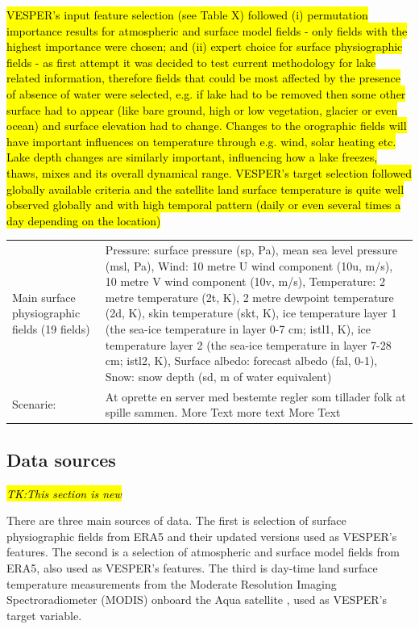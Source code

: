 \documentclass[hess, manuscript]{copernicus}
\begin{document}
\hl{VESPER's input feature selection (see Table X) followed (i) permutation importance results for atmospheric and surface model fields - only fields with the highest importance were chosen; and (ii) expert choice for surface physiographic fields - as first attempt it was decided to test current methodology for lake related information, therefore fields that could be most affected by the presence of absence of water were selected, e.g. if lake had to be removed then some other surface had to appear (like bare ground, high or low vegetation, glacier or even ocean) and surface elevation had to change. Changes to the orographic fields will have important influences on temperature through e.g. wind, solar heating etc. Lake depth changes are similarly important, influencing how a lake freezes, thaws, mixes and its overall dynamical range. VESPER's target selection followed globally available criteria and the satellite land surface temperature is quite well observed globally and with high temporal pattern (daily or even several times a day depending on the location)}

\begin{table}[h]
	\begin{tabularx}{\textwidth}{lX}
		\hline
		Main surface physiographic fields
		(19 fields)          & Pressure: surface pressure (sp, Pa), mean sea level pressure (msl, Pa), 
		Wind: 10 metre U wind component (10u, m/s), 10 metre V wind component (10v, m/s), 
		Temperature: 2 metre temperature (2t, K), 2 metre dewpoint temperature (2d, K), skin temperature (skt, K), ice temperature layer 1 (the sea-ice temperature in layer 0-7 cm; istl1, K), ice temperature layer 2 (the sea-ice temperature in layer 7-28 cm; istl2, K), 
		Surface albedo: forecast albedo (fal, 0-1), 
		Snow: snow depth (sd, m of water equivalent)
		
		 \\
		Scenarie:               & At oprette en server med bestemte regler som tillader folk at spille sammen. More Text more text More Text \\
		\hline
	\end{tabularx}
\end{table}




\subsection{Data sources }
\hl{\textit{TK:This section is new}}

There are three main sources of data. The first is selection of surface physiographic fields from ERA5 \citep{Hersbach} and their updated versions \citep{Choulga2019,Boussetta2021} \citep{Mu2021} used as VESPER’s features.
The second is a selection of atmospheric and surface model fields from ERA5, also used as VESPER’s features. The third is day-time land surface temperature measurements from the Moderate Resolution Imaging Spectroradiometer (MODIS) onboard the Aqua satellite \citep{MODIS}, used as VESPER’s target variable.
\end{document}
